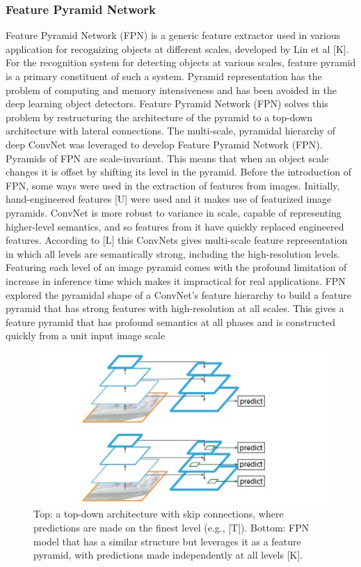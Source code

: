 \subsubsection{Feature Pyramid Network}
Feature Pyramid Network (FPN) is a generic feature extractor used in various application for recognizing objects at different scales, developed by Lin et al [K]. For the recognition system for detecting objects at various scales, feature pyramid is a primary constituent of such a system. Pyramid representation has the problem of computing and memory intensiveness and has been avoided in the deep learning object detectors. Feature Pyramid Network (FPN) solves this problem by restructuring the architecture of the pyramid to a top-down architecture with lateral connections. The multi-scale, pyramidal hierarchy of deep ConvNet was leveraged to develop Feature Pyramid Network (FPN). Pyramids of  FPN are scale-invariant. This means that when an object scale changes it is offset by shifting its level in the pyramid.  
 Before the introduction of FPN, some ways were used in the extraction of features from images. Initially, hand-engineered features [U] were used and it makes use of featurized image pyramids. ConvNet is more robust to variance in scale, capable of representing higher-level semantics, and so features from it have quickly replaced engineered features. According to [L] this ConvNets gives multi-scale feature representation in which all levels are semantically strong, including the high-resolution levels.  Featuring each level of an image pyramid comes with the profound limitation of increase in inference time which makes it impractical for real applications. FPN explored the pyramidal shape of a ConvNet’s feature hierarchy to build a feature pyramid that has strong features with high-resolution at all scales. This gives a feature pyramid that has profound semantics at all phases and is constructed quickly  from a unit  input image scale 
\begin{figure}
\centering
  \includegraphics[width=0.5\linewidth]{images/fpn.jpg}
   \caption{Top: a top-down architecture with skip connections, where predictions are made on the finest level (e.g., [T]). Bottom: FPN model that has a similar structure but leverages it as a feature pyramid, with predictions made independently at all levels [K].}
\end{figure}

